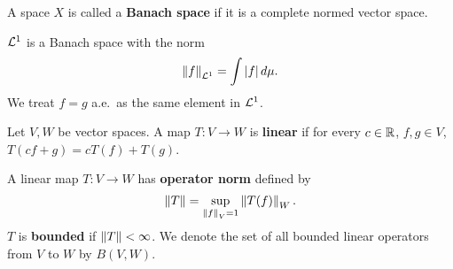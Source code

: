 \begin{definition}
    A space $X$ is called a \textbf{Banach space} if it is a 
    complete normed vector space.
\end{definition}
\begin{remark}
    $\mathcal{L}^1$ is a Banach space with the norm 
    \begin{equation*}
        \left\lVert {f} \right\rVert_{\mathcal{L}^1} = \int \left\lvert {f} \right\rvert d\mu.
    \end{equation*}
    We treat $f = g$ a.e.\ as the same element in $\mathcal{L}^1$.
\end{remark}

\begin{definition}
    Let $V,W$ be vector spaces. A map $T:V\to W$ is \textbf{linear} 
    if for every $c\in\mathbb{R}$, $f,g\in V$, $T(cf+g) = cT(f)+T(g)$.
\end{definition} 

\begin{definition}
    A linear map $T:V\to W$ has \textbf{operator norm} defined 
    by 
    \begin{equation*}
        \left\lVert {T} \right\rVert = \sup_{\left\lVert {f} \right\rVert_V=1}\left\lVert {T(f)} \right\rVert_W.
    \end{equation*} 
    $T$ is \textbf{bounded} if $\left\lVert {T} \right\rVert<\infty$. We denote the 
    set of all bounded linear operators from $V$ to $W$ by 
    $B(V,W)$. 
\end{definition}

